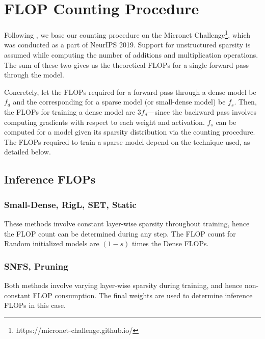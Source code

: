 \section{FLOP Counting Procedure}

Following \citet{rigl}, we base our counting procedure on the Micronet Challenge\footnote{https://micronet-challenge.github.io/}, which was conducted as a part of NeurIPS 2019. Support for unstructured sparsity is assumed while computing the number of additions and multiplication operations. The sum of these two gives us the theoretical FLOPs for a single forward pass through the model. 

Concretely, let the FLOPs required for a forward pass through a dense model be $f_d$ and the corresponding for a sparse model (or small-dense model) be $f_s$. Then, the FLOPs for training a dense model are $3f_d$---since the backward pass involves computing gradients with respect to each weight and activation. $f_s$ can be computed for a model given its sparsity distribution via the counting procedure. The FLOPs required to train a sparse model depend on the technique used, as detailed below.


\subsection{Inference FLOPs}


\subsubsection{Small-Dense, RigL, SET, Static} These methods involve constant layer-wise sparsity throughout training, hence the FLOP count can be determined during any step. The FLOP count for Random initialized models are $(1-s)$ times the Dense FLOPs.

\subsubsection{SNFS, Pruning} Both methods involve varying layer-wise sparsity during training, and hence non-constant FLOP consumption. The final weights are used to determine inference FLOPs in this case.

